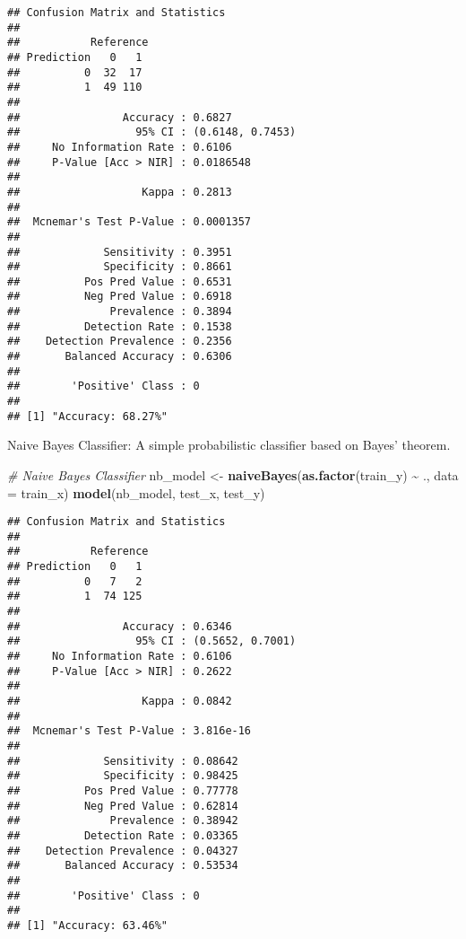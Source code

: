 \documentclass[
]{article}
\newenvironment{Shaded}{\begin{snugshade}}{\end{snugshade}}
\newcommand{\AttributeTok}[1]{\textcolor[rgb]{0.13,0.29,0.53}{#1}}
\newcommand{\CommentTok}[1]{\textcolor[rgb]{0.56,0.35,0.01}{\textit{#1}}}
\newcommand{\FunctionTok}[1]{\textcolor[rgb]{0.13,0.29,0.53}{\textbf{#1}}}
\newcommand{\NormalTok}[1]{#1}
\newcommand{\OtherTok}[1]{\textcolor[rgb]{0.56,0.35,0.01}{#1}}
\newcommand{\SpecialCharTok}[1]{\textcolor[rgb]{0.81,0.36,0.00}{\textbf{#1}}}
\begin{document}
\begin{verbatim}
## Confusion Matrix and Statistics
## 
##           Reference
## Prediction   0   1
##          0  32  17
##          1  49 110
##                                           
##                Accuracy : 0.6827          
##                  95% CI : (0.6148, 0.7453)
##     No Information Rate : 0.6106          
##     P-Value [Acc > NIR] : 0.0186548       
##                                           
##                   Kappa : 0.2813          
##                                           
##  Mcnemar's Test P-Value : 0.0001357       
##                                           
##             Sensitivity : 0.3951          
##             Specificity : 0.8661          
##          Pos Pred Value : 0.6531          
##          Neg Pred Value : 0.6918          
##              Prevalence : 0.3894          
##          Detection Rate : 0.1538          
##    Detection Prevalence : 0.2356          
##       Balanced Accuracy : 0.6306          
##                                           
##        'Positive' Class : 0               
##                                           
## [1] "Accuracy: 68.27%"
\end{verbatim}

Naive Bayes Classifier: A simple probabilistic classifier based on
Bayes' theorem.

\begin{Shaded}
\begin{Highlighting}[]
\CommentTok{\# Naive Bayes Classifier}
\NormalTok{nb\_model }\OtherTok{\textless{}{-}} \FunctionTok{naiveBayes}\NormalTok{(}\FunctionTok{as.factor}\NormalTok{(train\_y) }\SpecialCharTok{\textasciitilde{}}\NormalTok{ ., }\AttributeTok{data =}\NormalTok{ train\_x)}
\FunctionTok{model}\NormalTok{(nb\_model, test\_x, test\_y)}
\end{Highlighting}
\end{Shaded}

\begin{verbatim}
## Confusion Matrix and Statistics
## 
##           Reference
## Prediction   0   1
##          0   7   2
##          1  74 125
##                                           
##                Accuracy : 0.6346          
##                  95% CI : (0.5652, 0.7001)
##     No Information Rate : 0.6106          
##     P-Value [Acc > NIR] : 0.2622          
##                                           
##                   Kappa : 0.0842          
##                                           
##  Mcnemar's Test P-Value : 3.816e-16       
##                                           
##             Sensitivity : 0.08642         
##             Specificity : 0.98425         
##          Pos Pred Value : 0.77778         
##          Neg Pred Value : 0.62814         
##              Prevalence : 0.38942         
##          Detection Rate : 0.03365         
##    Detection Prevalence : 0.04327         
##       Balanced Accuracy : 0.53534         
##                                           
##        'Positive' Class : 0               
##                                           
## [1] "Accuracy: 63.46%"
\end{verbatim}
\end{document}
